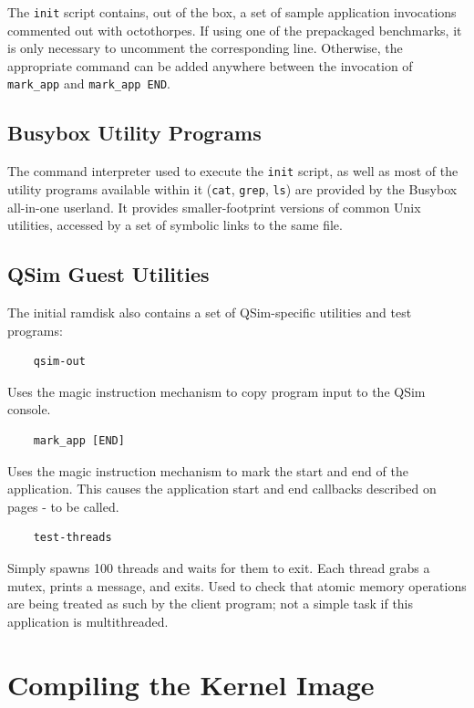 \documentclass[letterpaper, 10pt]{book}
\begin{document}
The \texttt{init} script contains, out of the box, a set of sample application
invocations commented out with octothorpes. If using one of the prepackaged
benchmarks, it is only necessary to uncomment the corresponding line. 
Otherwise, the appropriate command can be added anywhere between the invocation
of \texttt{mark\_app} and \texttt{mark\_app END}.

\subsection{Busybox Utility Programs}
The command interpreter used to execute the \texttt{init} script, as well as
most of the utility programs available within it (\texttt{cat}, \texttt{grep},
\texttt{ls}) are provided by the Busybox all-in-one userland.
It provides smaller-footprint versions of common Unix utilities, accessed by a
set of symbolic links to the same file.

\subsection{QSim Guest Utilities}
The initial ramdisk also contains a set of QSim-specific utilities and test
programs:

\begin{verbatim}
    qsim-out
\end{verbatim}
Uses the magic instruction mechanism to copy program input to the QSim console.

\begin{verbatim}
    mark_app [END]
\end{verbatim}
Uses the magic instruction mechanism to mark the start and end of the
application. This causes the application start and end callbacks described on
pages \pageref{func:set_app_start_cb}-\pageref{tf:set_app_end_cb} to be called.


\begin{verbatim}
    test-threads
\end{verbatim}
Simply spawns 100 threads and waits for them to exit. Each thread grabs a
mutex, prints a message, and exits. Used to check that atomic memory operations
are being treated as such by the client program; not a simple task if this
application is multithreaded.

\section{Compiling the Kernel Image}
\end{document}
